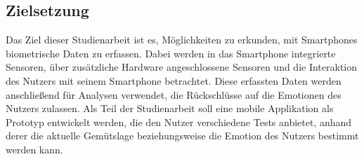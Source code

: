 \subsection{Zielsetzung}
Das Ziel dieser Studienarbeit ist es, Möglichkeiten zu erkunden, mit Smartphones biometrische Daten zu erfassen. Dabei werden in das Smartphone integrierte Sensoren, über zusätzliche Hardware angeschlossene Sensoren und die Interaktion des Nutzers mit seinem Smartphone betrachtet. Diese erfassten Daten werden anschließend für Analysen verwendet, die Rückschlüsse auf die Emotionen des Nutzers zulassen.
Als Teil der Studienarbeit soll eine mobile Applikation als Prototyp entwickelt werden, die den Nutzer verschiedene Tests anbietet, anhand derer die aktuelle Gemütslage beziehungsweise die Emotion des Nutzers bestimmt werden kann.
